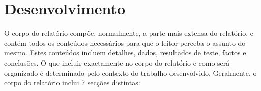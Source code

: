 

\chapter{Desenvolvimento}
\label{ch:desenvolvimento}


O corpo do relatório compõe, normalmente, a parte mais extensa do relatório, e contém todos os conteúdos necessários para que o leitor perceba o assunto do mesmo. Estes conteúdos incluem detalhes, dados, resultados de teste, factos e conclusões. O que incluir exactamente no corpo do relatório e como será organizado é determinado pelo contexto do trabalho desenvolvido. Geralmente, o corpo do relatório inclui 7 secções distintas:

